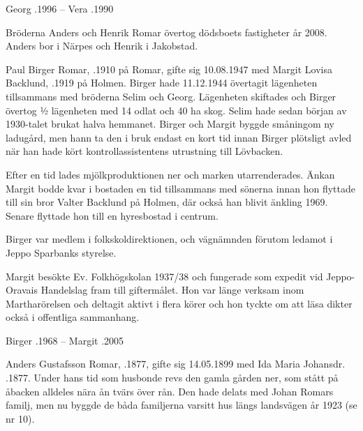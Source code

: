 Georg .1996  --  Vera .1990





Bröderna Anders och Henrik Romar övertog dödsboets fastigheter år 2008. Anders bor i Närpes och Henrik i Jakobstad.\jhvspace{}



Paul Birger Romar, .1910 på Romar, gifte sig 10.08.1947 med Margit Lovisa Backlund, .1919 på Holmen. Birger hade 11.12.1944 övertagit lägenheten tillsammans med bröderna Selim och Georg. Lägenheten skiftades och Birger övertog ½ lägenheten med 14 odlat och 40 ha skog. Selim hade sedan början av 1930-talet brukat halva hemmanet. Birger och Margit byggde småningom ny ladugård, men hann ta den i bruk endast en kort tid innan Birger plötsligt avled när han hade kört kontrollassistentens utrustning till Lövbacken.

Efter en tid lades mjölkproduktionen ner och marken utarrenderades. Änkan Margit bodde kvar i bostaden en tid tillsammans med sönerna innan hon flyttade till sin bror Valter Backlund på Holmen, där också han blivit änkling 1969. Senare flyttade hon till en hyresbostad i centrum.

Birger var medlem i folkskoldirektionen, och vägnämnden förutom ledamot i Jeppo Sparbanks styrelse.

Margit besökte Ev. Folkhögskolan 1937/38 och fungerade som expedit vid Jeppo-Oravais Handelslag fram till giftermålet. Hon var länge verksam inom Martharörelsen och deltagit aktivt i flera körer och hon tyckte om att läsa dikter också i offentliga sammanhang.

\begin{jhchildren}
  \item {}
  \item {}
\end{jhchildren}

Birger .1968  --  Margit .2005


Anders Gustafsson Romar, .1877, gifte sig 14.05.1899 med Ida Maria Johansdr. .1877. Under hans tid som husbonde revs den gamla gården ner, som stått på åbacken alldeles nära ån tvärs över rån. Den hade delats med Johan Romars familj, men nu byggde de båda familjerna varsitt hus längs landsvägen år 1923 (se nr 10).

